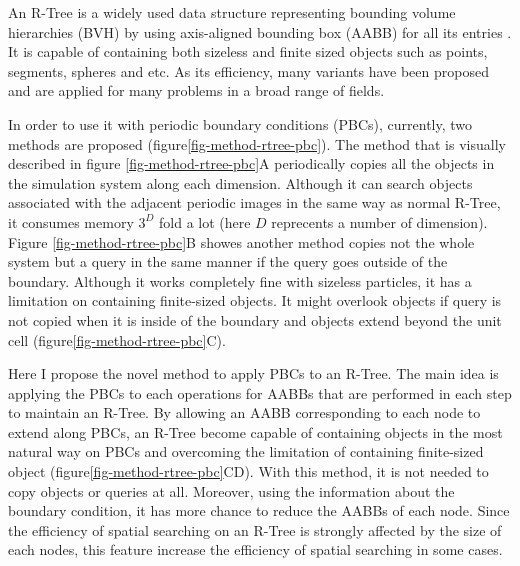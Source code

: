 \documentclass[10pt,letterpaper,twocolumn]{article}
\begin{document}
An R-Tree is a widely used data structure representing bounding volume
hierarchies (BVH) by using axis-aligned bounding box (AABB) for all its entries
\cite{Guttman1984}. It is capable of containing both sizeless and finite sized
objects such as points, segments, spheres and etc. As its efficiency, many
variants have been proposed and are applied for many problems in a broad range
of fields.

In order to use it with periodic boundary conditions (PBCs), currently,
two methods are proposed (figure\ref{fig-method-rtree-pbc})\cite{CoSTR-R-tree2016}.
The method that is visually described in figure \ref{fig-method-rtree-pbc}A
periodically copies all the objects in the simulation system along each dimension.
Although it can search objects associated with the adjacent periodic images in
the same way as normal R-Tree, it consumes memory $3^D$ fold a lot (here $D$
reprecents a number of dimension).
Figure \ref{fig-method-rtree-pbc}B showes another method copies not the whole
system but a query in the same manner if the query goes outside of the boundary.
Although it works completely fine with sizeless particles, it has a limitation on
containing finite-sized objects. It might overlook objects if query is not copied
when it is inside of the boundary and objects extend beyond the unit cell
(figure\ref{fig-method-rtree-pbc}C).

Here I propose the novel method to apply PBCs to an R-Tree. The main idea is
applying the PBCs to each operations for AABBs that are performed in each step
to maintain an R-Tree. By allowing an AABB corresponding to each node to extend
along PBCs, an R-Tree become capable of containing objects in the most natural
way on PBCs and overcoming the limitation of containing finite-sized object
(figure\ref{fig-method-rtree-pbc}CD).
With this method, it is not needed to copy objects or queries at all.
Moreover, using the information about the boundary condition, it has more chance
to reduce the AABBs of each node. Since the efficiency of spatial searching on
an R-Tree is strongly affected by the size of each nodes, this feature increase
the efficiency of spatial searching in some cases.
\end{document}
